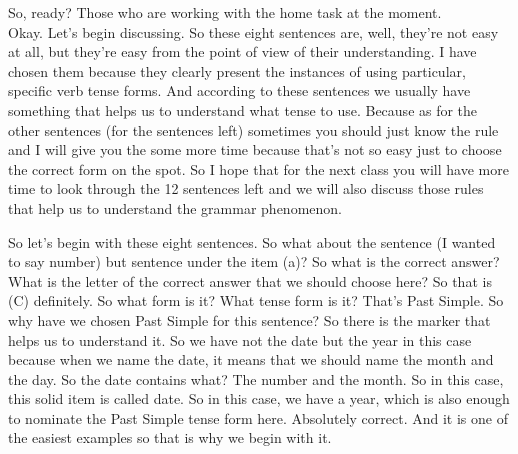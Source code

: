 \documentclass[main.tex]{subfiles}
\begin{document}
So, ready? Those who are working with the home task at the moment.
\\

Okay.
Let's begin discussing.
So these eight sentences are, well, they're not easy at all, but they're easy from the point of view of their understanding.
I have chosen them because they clearly present the instances of using particular, specific verb tense forms.
And according to these sentences we usually have something that helps us to understand what tense to use.
Because as for the other sentences (for the sentences left) sometimes you should just know the rule and I will give you the some more time because that's not so easy just to choose the correct form on the spot.
So I hope that for the next class you will have more time to look through the 12 sentences left and we will also discuss those rules that help us to understand the grammar phenomenon.

So let's begin with these eight sentences.
So what about the sentence (I wanted to say number) but sentence under the item (a)?
So what is the correct answer?
What is the letter of the correct answer that we should choose here?
So that is (C) definitely.
So what form is it?
What tense form is it?
That's Past Simple.
So why have we chosen Past Simple for this sentence?
So there is the marker that helps us to understand it.
So we have not the date but the year in this case because when we name the date, it means that we should name the month and the day.
So the date contains what?
The number and the month.
So in this case, this solid item is called date.
So in this case, we have a year, which is also enough to nominate the Past Simple tense form here.
Absolutely correct.
And it is one of the easiest examples so that is why we begin with it.
\end{document}
